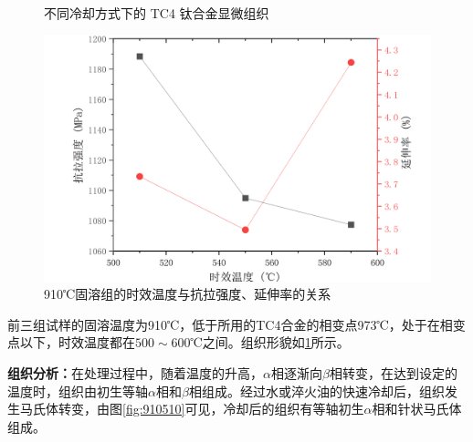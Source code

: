 \begin{figure}[htbp]
{\begin{minipage}[t]{0.33\linewidth}
					\label{fig:910550}
				\end{minipage}%
			}%
				\centering
				\label{910}
				\caption{不同冷却方式下的 TC4 钛合金显微组织}
			\end{figure}
			\begin{figure}[h!]
			\centering
			\includegraphics[width=0.7\linewidth]{pic/910分析}
			\caption{910℃固溶组的时效温度与抗拉强度、延伸率的关系}
			\label{fig:910}
		\end{figure}
			前三组试样的固溶温度为910℃，低于所用的TC4合金的相变点973℃，处于在相变点以下，时效温度都在$ 500\sim 600$℃之间。组织形貌如\ref{910}所示。

			\textbf{\faSchlix 组织分析：}在处理过程中，随着温度的升高，$ \alpha $相逐渐向$ \beta $相转变，在达到设定的温度时，组织由初生等轴$ \alpha $相和$ \beta $相组成。经过水或淬火油的快速冷却后，组织发生马氏体转变，由图\ref{fig:910510}可见，冷却后的组织有等轴初生$ \alpha $相和针状马氏体组成。

